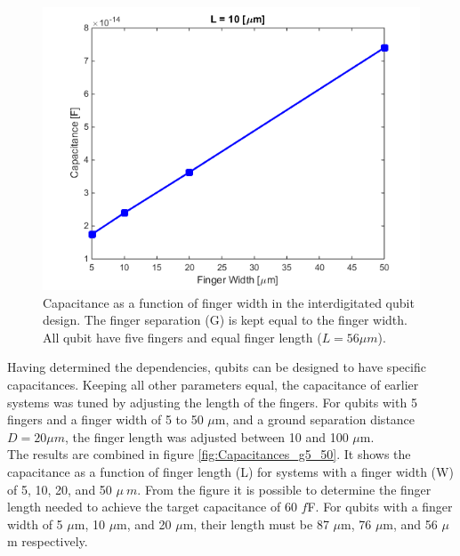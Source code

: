\begin{figure}
	\centering
	\includegraphics[scale = 0.7]{Figures/Capacitance_Plots/CapVSWidthL10.png}
	\caption{Capacitance as a function of finger width in the interdigitated qubit design. The finger separation (G) is kept equal to the finger width. All qubit have five fingers and equal finger length (\(L=56\mu m\)).}
	\label{fig:CapVSWidthL10}
\end{figure}

Having determined the dependencies, qubits can be designed to have specific capacitances. Keeping all other parameters equal, the capacitance of earlier systems was tuned by adjusting the length of the fingers. For qubits with 5 fingers and a finger width of 5 to 50 \(\mu\)m, and a ground separation distance \(D = 20\mu m\), the finger length was adjusted between 10 and 100 \(\mu\)m. \\
The results are combined in figure \ref{fig:Capacitances_g5_50}. It shows the capacitance as a function of finger length (L) for systems with a finger width (W) of 5, 10, 20, and 50 \(\mu\ m\). From the figure it is possible to determine the finger length needed to achieve the target capacitance of 60 \(f\)F. For qubits with a finger width of  5 \(\mu\)m, 10 \(\mu\)m, and 20 \(\mu\)m, their length must be 87 \(\mu\)m, 76 \(\mu\)m, and 56 \(\mu\)m  respectively.   

